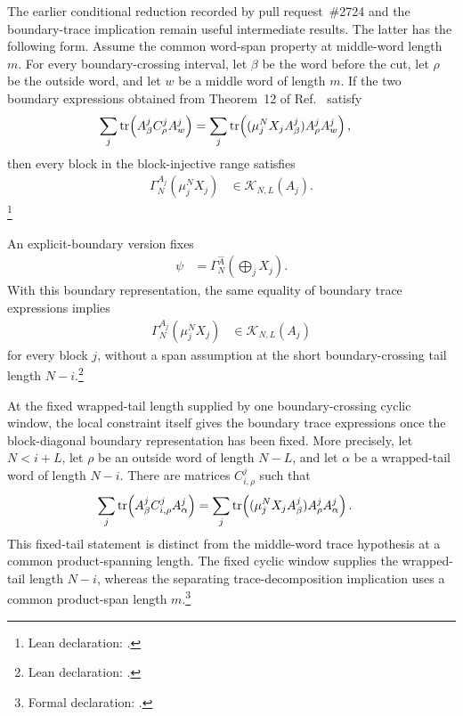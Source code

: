 \documentclass{article}
\begin{document}
The earlier conditional reduction recorded by pull request~\#2724 and the
boundary-trace implication remain useful intermediate results. The latter has
the following form. Assume the common word-span property at middle-word length
$m$. For every boundary-crossing interval, let $\beta$ be the word before the
cut, let $\rho$ be the outside word, and let $w$ be a middle word of length
$m$. If the two boundary expressions obtained from Theorem~12 of
Ref.~\cite{PerezGarcia2007MPSReps} satisfy
\begin{align}
  \sum_j
  \operatorname{tr}\!\left(A^j_\beta C^j_\rho A^j_w\right)
    &=
    \sum_j
    \operatorname{tr}\!\left((\mu_j^NX_jA^j_\beta)A^j_\rho A^j_w\right),
  \label{eq:cpgsv21_block_diagonal_parent_ground_space_trace_decomposition}
\end{align}
then every block in the block-injective range satisfies
\begin{align}
  \Gamma_N^{A_j}(\mu_j^NX_j)
    &\in
    \mathcal K_{N,L}(A_j).
  \label{eq:cpgsv21_block_diagonal_parent_ground_space_trace_component}
\end{align}
\footnote{Lean declaration:
.}

An explicit-boundary version fixes
\begin{align}
  \psi
    &=
    \Gamma_N^{\widehat A}
    \left(\bigoplus_jX_j\right).
  \label{eq:cpgsv21_block_diagonal_parent_ground_space_explicit_boundary}
\end{align}
With this boundary representation, the same equality of boundary trace
expressions implies
\begin{align}
  \Gamma_N^{A_j}(\mu_j^NX_j)
    &\in
    \mathcal K_{N,L}(A_j)
  \label{eq:cpgsv21_block_diagonal_parent_ground_space_explicit_component}
\end{align}
for every block $j$, without a span assumption at the short
boundary-crossing tail length $N-i$.\footnote{Lean declaration:
.}

At the fixed wrapped-tail length supplied by one boundary-crossing cyclic
window, the local constraint itself gives the boundary trace expressions once
the block-diagonal boundary representation has been fixed. More precisely, let
$N<i+L$, let $\rho$ be an outside word of length $N-L$, and let $\alpha$ be a
wrapped-tail word of length $N-i$. There are matrices $C^j_{i,\rho}$ such that
\begin{align}
  \sum_j
  \operatorname{tr}\!\left(A^j_\beta C^j_{i,\rho}A^j_\alpha\right)
    &=
    \sum_j
    \operatorname{tr}\!\left((\mu_j^NX_jA^j_\beta)A^j_\rho A^j_\alpha\right).
  \label{eq:cpgsv21_block_diagonal_parent_ground_space_fixed_tail_trace}
\end{align}
This fixed-tail statement is distinct from the middle-word trace hypothesis at
a common product-spanning length. The fixed cyclic window supplies the
wrapped-tail length $N-i$, whereas the separating trace-decomposition
implication uses a common product-span length $m$.\footnote{Formal declaration:
.}
\end{document}
